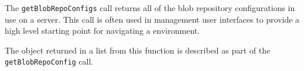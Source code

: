 The \verb+getBlobRepoConfigs+ call returns all of the blob repository configurations in use
on a \Rapture server. This call is often used in management user interfaces to provide a high level
starting point for navigating a \Rapture environment.

The object returned in a list from this function is described as part of the \verb+getBlobRepoConfig+ call.
